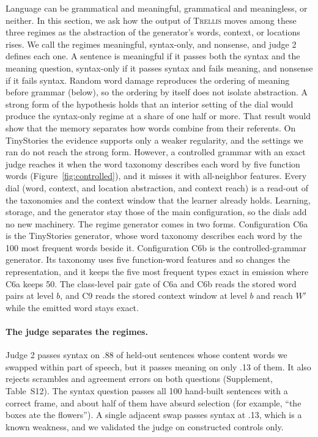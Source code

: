 \documentclass[11pt,letterpaper]{article}
\newcommand{\trellis}{\textsc{Trellis}}
\begin{document}
Language can be grammatical and meaningful, grammatical and meaningless, or neither. In this section, we ask how the output of \trellis{} moves among these three regimes as the abstraction of the generator's words, context, or locations rises.
We call the regimes meaningful, syntax-only, and nonsense, and judge 2 defines each one. A sentence is meaningful if it passes both the syntax and the meaning question, syntax-only if it passes syntax and fails meaning, and nonsense if it fails syntax. Random word damage reproduces the ordering of meaning before grammar (below), so the ordering by itself does not isolate abstraction.
A strong form of the hypothesis holds that an interior setting of the dial would produce the syntax-only regime at a share of one half or more. That result would show that the memory separates how words combine from their referents. On TinyStories the evidence supports only a weaker regularity, and the settings we ran do not reach the strong form. However, a controlled grammar with an exact judge reaches it when the word taxonomy describes each word by five function words (Figure~\ref{fig:controlled}), and it misses it with all-neighbor features.
Every dial (word, context, and location abstraction, and context reach) is a read-out of the taxonomies and the context window that the learner already holds. Learning, storage, and the generator stay those of the main configuration, so the dials add no new machinery.
The regime generator comes in two forms. Configuration C6a is the TinyStories generator, whose word taxonomy describes each word by the 100 most frequent words beside it. Configuration C6b is the controlled-grammar generator. Its taxonomy uses five function-word features and so changes the representation, and it keeps the five most frequent types exact in emission where C6a keeps 50. The class-level pair gate of C6a and C6b reads the stored word pairs at level $b$, and C9 reads the stored context window at level $b$ and reach $W'$ while the emitted word stays exact.

\paragraph{The judge separates the regimes.} Judge 2 passes syntax on .88 of held-out sentences whose content words we swapped within part of speech, but it passes meaning on only .13 of them. It also rejects scrambles and agreement errors on both questions (Supplement, Table~S12).
The syntax question passes all 100 hand-built sentences with a correct frame, and about half of them have absurd selection (for example, ``the boxes ate the flowers''). A single adjacent swap passes syntax at .13, which is a known weakness, and we validated the judge on constructed controls only.
\end{document}
